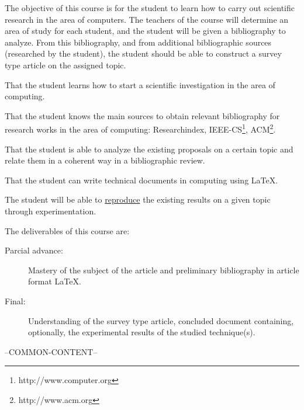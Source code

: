 \begin{syllabus}


\begin{justification}
  The objective of this course is for the student to learn how to carry out scientific research in the area of computers. The teachers of the course will determine an area of study for each student, and the student will be given a bibliography to analyze. From this bibliography, and from additional bibliographic sources (researched by the student), the student should be able to construct a survey type article on the assigned topic.
\end{justification}

\begin{goals}
\item That the student learns how to start a scientific investigation in the area of computing.
\item That the student knows the main sources to obtain relevant bibliography for research works in the area of computing: Researchindex, IEEE-CS\footnote{http://www.computer.org}, ACM\footnote{http://www.acm.org}.
\item That the student is able to analyze the existing proposals on a certain topic and relate them in a coherent way in a bibliographic review.
\item That the student can write technical documents in computing using \LaTeX.
\item The student will be able to \underline{reproduce} the existing results on a given topic through experimentation.
\item The deliverables of this course are:
	\begin{description}
	\item [Parcial advance:] Mastery of the subject of the article and preliminary bibliography in article format \LaTeX.
	\item [Final:] Understanding of the survey type article, concluded document containing, optionally, the experimental results of the studied technique(s).
	\end{description}
\end{goals}

--COMMON-CONTENT--


\end{syllabus}
